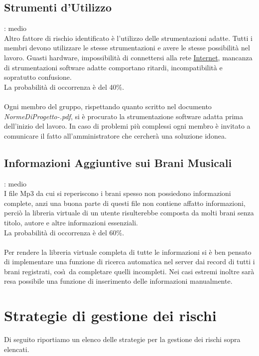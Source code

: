 \subsection{Strumenti d'Utilizzo}
: medio\\
Altro fattore di rischio identificato \`e l'utilizzo delle strumentazioni adatte. 
Tutti i membri devono utilizzare le stesse strumentazioni e avere le stesse possibilit\`a nel lavoro. 
Guasti hardware, impossibilit\`a di connettersi alla rete \underline{Internet},
mancanza di strumentazioni software adatte comportano ritardi, incompatibilit\`a e sopratutto confusione. \\
La probabilit\`a di occorrenza \`e del 40\%.\\
\\
Ogni membro del gruppo, 
rispettando quanto scritto nel documento
\emph{NormeDiProgetto-\versionenormeprogetto.pdf}, si \`e procurato la
strumentazione software adatta prima dell'inizio del lavoro. In caso di problemi
pi\`u complessi ogni membro \`e invitato a comunicare il fatto
all'amministratore che cercher\`a una soluzione idonea.

\subsection{Informazioni Aggiuntive sui Brani Musicali}
: medio\\
I file Mp3 da cui si reperiscono i brani spesso non possiedono informazioni
complete, anzi una buona parte di questi file non contiene affatto informazioni, perci\`o la libreria virtuale 
di un utente risulterebbe composta da molti brani senza titolo, autore e altre
informazioni essenziali.\\
La probabilit\`a di occorrenza \`e del 60\%.\\
\\
Per rendere la libreria virtuale completa di tutte le informazioni si \`e ben pensato di implementare una 
funzione di ricerca automatica nel server dai record di tutti i brani registrati, cos\`\i\ da completare 
quelli incompleti. Nei casi estremi inoltre sar\`a resa possibile una funzione
di inserimento delle informazioni manualmente.

\section{Strategie di gestione dei rischi}

Di seguito riportiamo un elenco delle strategie per la gestione dei rischi sopra
elencati.\\

